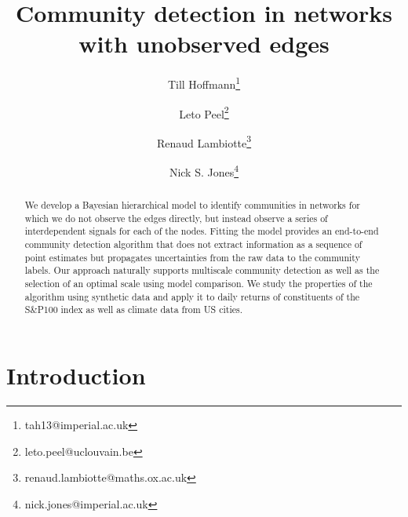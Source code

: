\documentclass[onecolumn,pre,superscriptaddress, longbibliography, nofootinbib, notitlepage]{revtex4-1}
\begin{document}
\title{Community detection in networks with unobserved edges}

\author{Till Hoffmann\thanks{tah13@imperial.ac.uk}}
\author{Leto Peel\thanks{leto.peel@uclouvain.be}}
\author{Renaud Lambiotte\thanks{renaud.lambiotte@maths.ox.ac.uk}}
\author{Nick S. Jones\thanks{nick.jones@imperial.ac.uk}}


\begin{abstract}
    We develop a Bayesian hierarchical model to identify communities in networks for which we do not observe the edges directly, but instead observe a series of interdependent signals for each of the nodes. Fitting the model provides an end-to-end community detection algorithm that does not extract information as a sequence of point estimates but propagates uncertainties from the raw data to the community labels. Our approach naturally supports multiscale community detection as well as the selection of an optimal scale using model comparison. We study the properties of the algorithm using synthetic data and apply it to daily returns of constituents of the S\&P100 index as well as climate data from US cities.
\end{abstract}

\maketitle

\section{Introduction}
\end{document}
